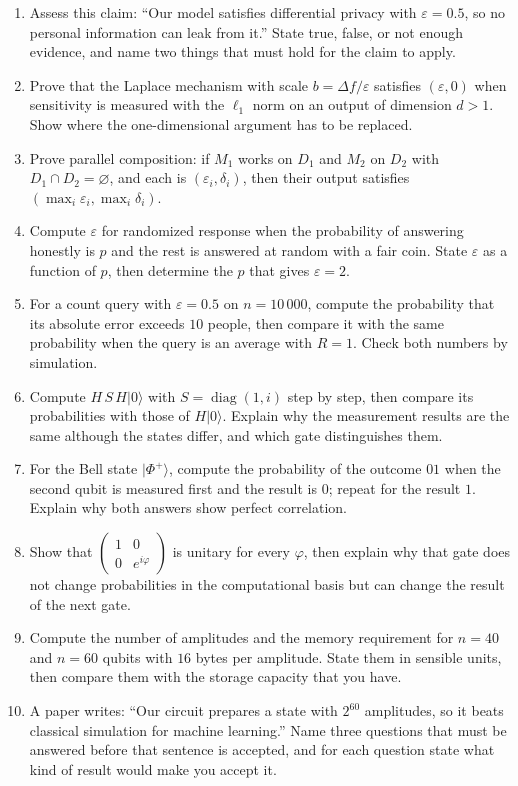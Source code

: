 \begin{latihan}
\begin{enumerate}
  \item Assess this claim: ``Our model satisfies differential privacy with
        $\varepsilon=0.5$, so no personal information can leak from it.'' State true,
        false, or not enough evidence, and name two things that must hold for the claim to
        apply.
  \item Prove that the Laplace mechanism with scale $b=\Delta f/\varepsilon$ satisfies
        $(\varepsilon,0)$ when sensitivity is measured with the $\ell_1$ norm on an output
        of dimension $d>1$. Show where the one-dimensional argument has to be replaced.
  \item Prove parallel composition: if $M_1$ works on $D_1$ and $M_2$ on $D_2$ with
        $D_1\cap D_2=\varnothing$, and each is $(\varepsilon_i,\delta_i)$, then their
        output satisfies $(\max_i\varepsilon_i,\max_i\delta_i)$.
  \item Compute $\varepsilon$ for randomized response when the probability of answering
        honestly is $p$ and the rest is answered at random with a fair coin. State
        $\varepsilon$ as a function of $p$, then determine the $p$ that gives
        $\varepsilon=2$.
  \item For a count query with $\varepsilon=0.5$ on $n=10\,000$, compute the probability
        that its absolute error exceeds $10$ people, then compare it with the same
        probability when the query is an average with $R=1$. Check both numbers by
        simulation.
  \item Compute $H\,S\,H|0\rangle$ with $S=\operatorname{diag}(1,i)$ step by step, then
        compare its probabilities with those of $H|0\rangle$. Explain why the measurement
        results are the same although the states differ, and which gate distinguishes them.
  \item For the Bell state $|\Phi^{+}\rangle$, compute the probability of the outcome $01$
        when the second qubit is measured first and the result is $0$; repeat for the
        result $1$. Explain why both answers show perfect correlation.
  \item Show that $\begin{pmatrix}1&0\\0&e^{i\varphi}\end{pmatrix}$ is unitary for every
        $\varphi$, then explain why that gate does not change probabilities in the
        computational basis but can change the result of the next gate.
  \item Compute the number of amplitudes and the memory requirement for $n=40$ and $n=60$
        qubits with $16$ bytes per amplitude. State them in sensible units, then compare
        them with the storage capacity that you have.
  \item A paper writes: ``Our circuit prepares a state with $2^{60}$ amplitudes, so it
        beats classical simulation for machine learning.'' Name three questions that must
        be answered before that sentence is accepted, and for each question state what
        kind of result would make you accept it.
\end{enumerate}


\end{latihan}
